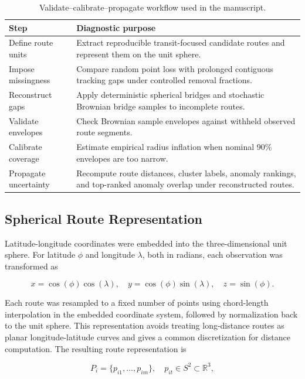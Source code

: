 \begin{table}[H]
\centering
\caption{Validate--calibrate--propagate workflow used in the manuscript.}
\label{tab:diagnostic-workflow}
\small
\begin{tabular}{p{}p{}}
\toprule
Step & Diagnostic purpose \\
\midrule
Define route units & Extract reproducible transit-focused candidate routes and represent them on the unit sphere. \\
Impose missingness & Compare random point loss with prolonged contiguous tracking gaps under controlled removal fractions. \\
Reconstruct gaps & Apply deterministic spherical bridges and stochastic Brownian bridge samples to incomplete routes. \\
Validate envelopes & Check Brownian sample envelopes against withheld observed route segments. \\
Calibrate coverage & Estimate empirical radius inflation when nominal 90\% envelopes are too narrow. \\
Propagate uncertainty & Recompute route distances, cluster labels, anomaly rankings, and top-ranked anomaly overlap under reconstructed routes. \\
\bottomrule
\end{tabular}
\end{table}

\subsection{Spherical Route Representation}\label{spherical-route-representation}

Latitude-longitude coordinates were embedded into the three-dimensional unit sphere. For latitude \(\phi\) and longitude \(\lambda\), both in radians, each observation was transformed as

\[
x = \cos(\phi)\cos(\lambda), \quad
y = \cos(\phi)\sin(\lambda), \quad
z = \sin(\phi).
\]

Each route was resampled to a fixed number of points using chord-length interpolation in the embedded coordinate system, followed by normalization back to the unit sphere. This representation avoids treating long-distance routes as planar longitude-latitude curves and gives a common discretization for distance computation. The resulting route representation is

\[
P_i = \{p_{i1}, \ldots, p_{im}\}, \quad p_{it} \in S^2 \subset \mathbb{R}^3,
\]

